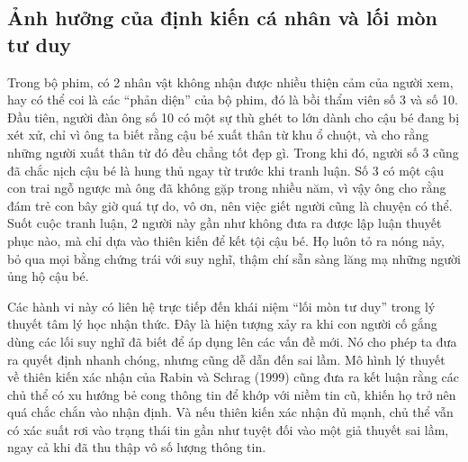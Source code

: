 \documentclass[12pt,a4paper]{article}
\begin{document}
\subsection{Ảnh hưởng của định kiến cá nhân và lối mòn tư duy}
Trong bộ phim, có 2 nhân vật không nhận được nhiều thiện cảm của người xem, hay có thể coi là các ``phản diện'' của bộ phim, đó là
bồi thẩm viên số 3 và số 10. Đầu tiên, người đàn ông số 10 có một sự thù ghét to lớn dành cho cậu bé đang bị xét xử, chỉ vì ông ta biết rằng cậu bé xuất thân từ khu ổ chuột,
và cho rằng những người xuất thân từ đó đều chẳng tốt đẹp gì.
Trong khi đó, người số 3 cũng đã chắc nịch cậu bé là hung thủ ngay từ trước khi tranh luận.
Số 3 có một cậu con trai ngỗ ngược mà ông đã không gặp trong nhiều năm, vì vậy ông cho rằng đám trẻ con bây giờ quá tự do, vô ơn, nên việc giết người cũng là chuyện có thể.
Suốt cuộc tranh luận, 2 người này gần như không đưa ra được lập luận thuyết phục nào, mà chỉ dựa vào thiên kiến để kết tội cậu bé.
Họ luôn tỏ ra nóng nảy, bỏ qua mọi bằng chứng trái với suy nghĩ, thậm chí sẵn sàng lăng mạ những người ủng hộ cậu bé.




Các hành vi này có liên hệ trực tiếp đến khái niệm ``lối mòn tư duy'' trong lý thuyết tâm lý học nhận thức. Đây là hiện tượng xảy ra khi con người cố gắng dùng các lối suy nghĩ đã biết để áp dụng lên
các vấn đề mới. Nó cho phép ta đưa ra quyết định nhanh chóng, nhưng cũng dễ dẫn đến sai lầm. Mô hình lý thuyết về thiên kiến xác nhận của Rabin và Schrag  (1999)
cũng đưa ra kết luận rằng các chủ thể có xu hướng bẻ cong thông tin để khớp với niềm tin cũ, khiến họ trở nên quá chắc chắn vào nhận định.
Và nếu thiên kiến xác nhận đủ mạnh, chủ thể vẫn có xác suất rơi vào trạng thái tin gần như tuyệt đối vào một giả thuyết sai lầm, ngay cả khi đã thu thập vô số lượng thông tin.
\end{document}
